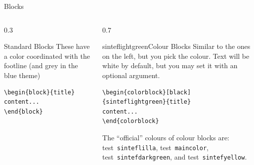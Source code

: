 \documentclass{beamer}
\newcommand{\testcolor}[1]{\colorbox{#1}{\textcolor{#1}{test}}~\texttt{#1}}
\begin{document}
\begin{frame}[fragile]{Blocks}
\begin{columns}
\begin{column}{0.3\textwidth}
\begin{block}{Standard Blocks}
These have a color coordinated with the footline (and grey in the blue theme)
\begin{verbatim}
\begin{block}{title}
content...
\end{block}
\end{verbatim}
\end{block}
\end{column}
\begin{column}{0.7\textwidth}
\begin{colorblock}[black]{sinteflightgreen}{Colour Blocks}
Similar to the ones on the left, but you pick the colour. Text will be white by 
default, but you may set it with an optional argument.
\small
\begin{verbatim}
\begin{colorblock}[black]{sinteflightgreen}{title}
content...
\end{colorblock}
\end{verbatim}
\end{colorblock}
The ``official'' colours of colour blocks are: \testcolor{sinteflilla}, 
\testcolor{maincolor}, \testcolor{sintefdarkgreen}, and 
\testcolor{sintefyellow}.
\end{column}
\end{columns}
\end{frame}
\end{document}
